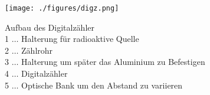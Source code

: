 \begin{figure}[H]
    \begin{center}
        \texttt{[image: ./figures/digz.png]}
    \end{center}
    \caption[Aufbau des Digitalzähler]{
        Aufbau des Digitalzähler           \\
        1 \(\dots\) Halterung
        für radioaktive Quelle             \\
        2 \(\dots\) Zählrohr               \\
        3 \(\dots\) Halterung um
        später das Aluminium zu Befestigen \\
        4 \(\dots\) Digitalzähler          \\
        5 \(\dots\)
        Optische Bank um den Abstand zu variieren
    }\label{fig:digz}
\end{figure}
